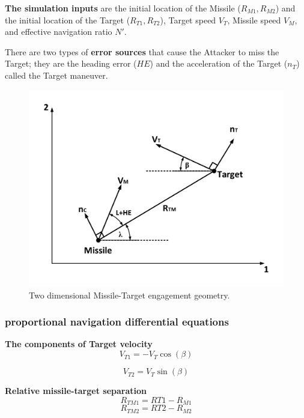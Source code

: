 \textbf{The simulation inputs} are the initial location of the Missile ($R_{M1}, R_{M2}$) and the initial location of the Target ($R_{T1}, R_{T2}$), Target speed $V_T$, Missile speed $V_M$, and effective navigation ratio $N'$.

There are two types of \textbf{error sources} that cause the Attacker to miss the Target; they are the heading error ($HE$) and the acceleration of the Target ($n_T$) called the Target maneuver.

\begin{figure}[htb]
	\centering
	\includegraphics[scale = 0.65]{fig/PN.pdf}
	\caption{Two dimensional Missile-Target engagement geometry.}
	\label{PN}
\end{figure}


\subsubsection*{proportional navigation differential equations}

\textbf{The components of Target velocity} 
\begin{equation}
	V_{T1} = - V_T \cos(\beta)
\end{equation}

\begin{equation}
V_{T2} =  V_T \sin(\beta)
\end{equation}

\textbf{Relative missile-target separation}
\begin{equation}
	R_{TM1} = R{T1} - R_{M1}
\end{equation}
\begin{equation}
R_{TM2} = R{T2} - R_{M2}
\end{equation}

